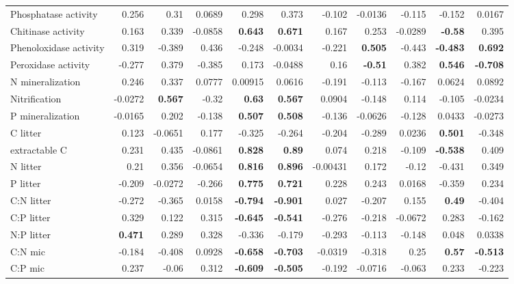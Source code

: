 \documentclass[10pt]{article}
\begin{document}
\begin{flushleft}
\begin{landscape}
\begin{table}[h!]
\begin{center}
{\begin{tabular}{lrrrrrrrrrr}
  Phosphatase activity & 0.256 & 0.31 & 0.0689 & 0.298 & 0.373 & -0.102 & -0.0136 & -0.115 & -0.152 & 0.0167 \\ 
  Chitinase activity & 0.163 & 0.339 & -0.0858 & \textbf{ 0.643 } & \textbf{ 0.671 } & 0.167 & 0.253 & -0.0289 & \textbf{ -0.58 } & 0.395 \\ 
  Phenoloxidase activity & 0.319 & -0.389 & 0.436 & -0.248 & -0.0034 & -0.221 & \textbf{ 0.505 } & -0.443 & \textbf{ -0.483 } & \textbf{ 0.692 } \\ 
  Peroxidase activity & -0.277 & 0.379 & -0.385 & 0.173 & -0.0488 & 0.16 & \textbf{ -0.51 } & 0.382 & \textbf{ 0.546 } & \textbf{ -0.708 } \\ 
  N mineralization & 0.246 & 0.337 & 0.0777 & 0.00915 & 0.0616 & -0.191 & -0.113 & -0.167 & 0.0624 & 0.0892 \\ 
  Nitrification & -0.0272 & \textbf{ 0.567 } & -0.32 & \textbf{ 0.63 } & \textbf{ 0.567 } & 0.0904 & -0.148 & 0.114 & -0.105 & -0.0234 \\ 
  P mineralization & -0.0165 & 0.202 & -0.138 & \textbf{ 0.507 } & \textbf{ 0.508 } & -0.136 & -0.0626 & -0.128 & 0.0433 & -0.0273 \\ 
  C litter & 0.123 & -0.0651 & 0.177 & -0.325 & -0.264 & -0.204 & -0.289 & 0.0236 & \textbf{ 0.501 } & -0.348 \\ 
  extractable C & 0.231 & 0.435 & -0.0861 & \textbf{ 0.828 } & \textbf{ 0.89 } & 0.074 & 0.218 & -0.109 & \textbf{ -0.538 } & 0.409 \\ 
  N litter & 0.21 & 0.356 & -0.0654 & \textbf{ 0.816 } & \textbf{ 0.896 } & -0.00431 & 0.172 & -0.12 & -0.431 & 0.349 \\ 
  P litter & -0.209 & -0.0272 & -0.266 & \textbf{ 0.775 } & \textbf{ 0.721 } & 0.228 & 0.243 & 0.0168 & -0.359 & 0.234 \\ 
  C:N litter & -0.272 & -0.365 & 0.0158 & \textbf{ -0.794 } & \textbf{ -0.901 } & 0.027 & -0.207 & 0.155 & \textbf{ 0.49 } & -0.404 \\ 
  C:P litter & 0.329 & 0.122 & 0.315 & \textbf{ -0.645 } & \textbf{ -0.541 } & -0.276 & -0.218 & -0.0672 & 0.283 & -0.162 \\ 
  N:P litter & \textbf{ 0.471 } & 0.289 & 0.328 & -0.336 & -0.179 & -0.293 & -0.113 & -0.148 & 0.048 & 0.0338 \\ 
  C:N mic & -0.184 & -0.408 & 0.0928 & \textbf{ -0.658 } & \textbf{ -0.703 } & -0.0319 & -0.318 & 0.25 & \textbf{ 0.57 } & \textbf{ -0.513 } \\ 
  C:P mic & 0.237 & -0.06 & 0.312 & \textbf{ -0.609 } & \textbf{ -0.505 } & -0.192 & -0.0716 & -0.063 & 0.233 & -0.223 \\ 

\end{tabular}}
\end{center}
\end{table}
\end{landscape}
\end{flushleft}
\end{document}
